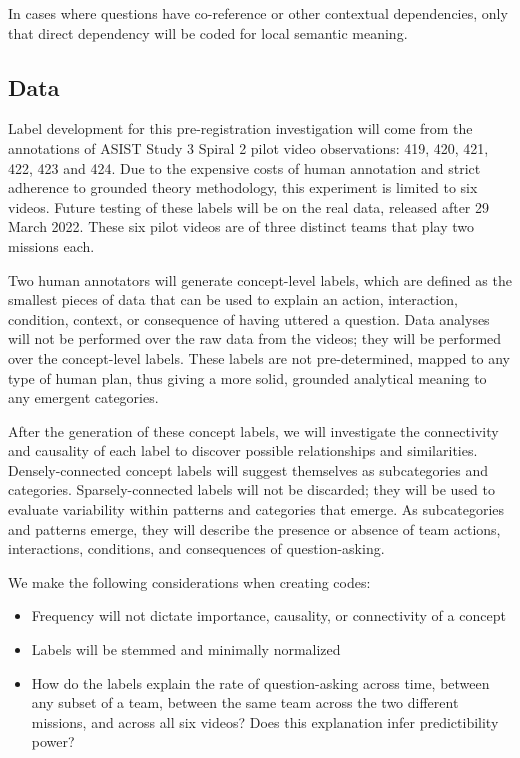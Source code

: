 In cases where questions have co-reference or other contextual dependencies, only that direct dependency will be coded for local semantic meaning.

\subsection{Data}

Label development for this pre-registration investigation will come from the annotations of ASIST Study 3 Spiral 2 pilot video observations: 419, 420, 421, 422, 423 and 424. Due to the expensive costs of human annotation and strict adherence to grounded theory methodology, this experiment is limited to six videos.  Future testing of these labels will be on the real data, released after 29 March 2022. These six pilot videos are of three distinct teams that play two missions each.  

Two human annotators will generate concept-level labels, which are defined as the smallest pieces of data that can be used to explain an action, interaction, condition, context, or consequence of having uttered a question. Data analyses will not be performed over the raw data from the videos; they will be performed over the concept-level labels. These labels are not pre-determined, mapped to any type of human plan, thus giving a more solid, grounded analytical meaning to any emergent categories. 


After the generation of these concept labels, we will investigate the connectivity and causality of each label to discover possible relationships and similarities. Densely-connected concept labels will suggest themselves as subcategories and categories. Sparsely-connected labels will not be discarded; they will be used to evaluate variability within patterns and categories that emerge. As subcategories and patterns emerge, they will describe the presence or absence of team actions, interactions, conditions, and consequences of question-asking. 

We make the following considerations when creating codes: 
\begin{itemize}
    \item Frequency will not dictate importance, causality, or connectivity of a concept
    \item Labels will be stemmed and minimally normalized 
    \item How do the labels explain the rate of question-asking across time, between any subset of a team, between the same team across the two different missions, and across all six videos? Does this explanation infer predictibility power?
\end{itemize}

